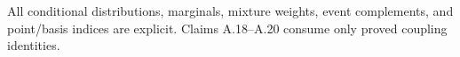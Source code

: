 
All conditional distributions, marginals, mixture weights, event complements,
and point/basis indices are explicit. Claims A.18--A.20 consume only proved
coupling identities.


